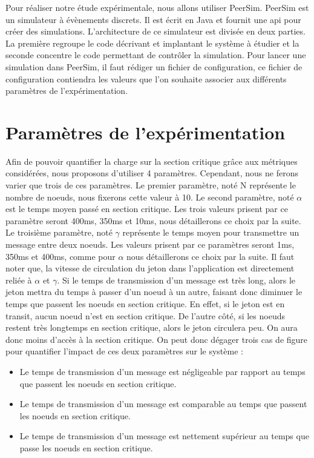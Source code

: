\documentclass[12pt,a4paper]{article}
\begin{document}
Pour réaliser notre étude expérimentale, nous allons utiliser PeerSim. PeerSim est un simulateur à évènements discrets. Il est écrit en Java et fournit une api pour créer des simulations. L'architecture de ce simulateur est divisée en deux parties. La première regroupe le code décrivant et implantant le système à étudier et la seconde concentre le code permettant de contrôler la simulation. Pour lancer une simulation dans PeerSim, il faut rédiger un fichier de configuration, ce fichier de configuration contiendra les valeurs que l'on souhaite associer aux différents paramètres de l'expérimentation. 


\section{Paramètres de l'expérimentation}

Afin de pouvoir quantifier la charge sur la section critique grâce aux métriques considérées, nous proposons d'utiliser 4 paramètres. Cependant, nous ne ferons varier que trois de ces paramètres. Le premier paramètre, noté N représente le nombre de noeuds, nous fixerons cette valeur à 10. Le second paramètre, noté $\alpha$ est le temps moyen passé en section critique. Les trois valeurs prisent par ce paramètre seront 400ms, 350ms et 10ms, nous détaillerons ce choix par la suite. Le troisième paramètre, noté $\gamma$ représente le temps moyen pour transmettre un message entre deux noeuds. Les valeurs prisent par ce paramètres seront 1ms, 350ms et 400ms, comme pour $\alpha$ nous détaillerons ce choix par la suite. Il faut noter que, la vitesse de circulation du jeton dans l'application est directement reliée à $\alpha$ et $\gamma$. Si le temps de transmission d'un message est très long, alors le jeton mettra du temps à passer d'un noeud à un autre, faisant donc diminuer le temps que passent les noeuds en section critique. En effet, si le jeton est en transit, aucun noeud n'est en section critique. De l'autre côté, si les noeuds restent très longtemps en section critique, alors le jeton circulera peu. On aura donc moins d'accès à la section critique. On peut donc dégager trois cas de figure pour quantifier l'impact de ces deux paramètres sur le système : 

\begin{itemize}
\item Le temps de transmission d'un message est négligeable par rapport au temps que passent les noeuds en section critique.
\item Le temps de transmission d'un message est comparable au temps que passent les noeuds en section critique.
\item Le temps de transmission d'un message est nettement supérieur au temps que passe les noeuds en section critique.
\end{itemize} 
\end{document}
